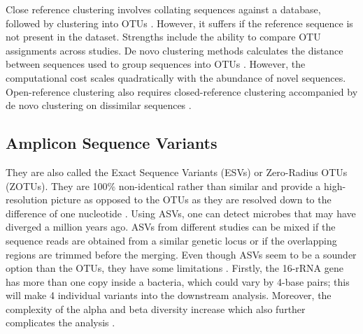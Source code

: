 Close reference clustering involves collating sequences against a database, followed by clustering into OTUs \cite{ref15}. However, it suffers if the reference sequence is not present in the dataset. Strengths include the ability to compare OTU assignments across studies. De novo clustering methods calculates the distance between sequences used to group sequences into OTUs \cite{ref15}. However, the computational cost scales quadratically with the abundance of novel sequences. Open-reference clustering also requires closed-reference clustering accompanied by de novo clustering on dissimilar sequences \cite{ref15}.

\subsection*{Amplicon Sequence Variants}
They are also called the Exact Sequence Variants (ESVs) or Zero-Radius OTUs (ZOTUs). They are 100\% non-identical rather than similar and provide a high-resolution picture as opposed to the OTUs as they are resolved down to the difference of one nucleotide \cite{ref16}. Using ASVs, one can detect microbes that may have diverged a million years ago. ASVs from different studies can be mixed if the sequence reads are obtained from a similar genetic locus or if the overlapping regions are trimmed before the merging. Even though ASVs seem to be a sounder option than the OTUs, they have some limitations \cite{ref16}. Firstly, the 16-rRNA gene has more than one copy inside a bacteria, which could vary by 4-base pairs; this will make 4 individual variants into the downstream analysis. Moreover, the complexity of the alpha and beta diversity increase which also further complicates the analysis \cite{ref16}.